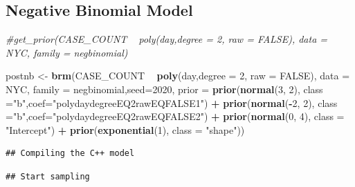 \documentclass[]{article}
\newenvironment{Shaded}{\begin{snugshade}}{\end{snugshade}}
\newcommand{\CommentTok}[1]{\textcolor[rgb]{0.56,0.35,0.01}{\textit{#1}}}
\newcommand{\DataTypeTok}[1]{\textcolor[rgb]{0.13,0.29,0.53}{#1}}
\newcommand{\DecValTok}[1]{\textcolor[rgb]{0.00,0.00,0.81}{#1}}
\newcommand{\KeywordTok}[1]{\textcolor[rgb]{0.13,0.29,0.53}{\textbf{#1}}}
\newcommand{\NormalTok}[1]{#1}
\newcommand{\OperatorTok}[1]{\textcolor[rgb]{0.81,0.36,0.00}{\textbf{#1}}}
\newcommand{\OtherTok}[1]{\textcolor[rgb]{0.56,0.35,0.01}{#1}}
\newcommand{\StringTok}[1]{\textcolor[rgb]{0.31,0.60,0.02}{#1}}
\begin{document}
\hypertarget{negative-binomial-model}{%
\subsection{Negative Binomial Model}\label{negative-binomial-model}}

\begin{Shaded}
\begin{Highlighting}[]
\CommentTok{#get_prior(CASE_COUNT ~ poly(day,degree = 2, raw = FALSE), data = NYC, family =  negbinomial)}

\NormalTok{postnb <-}\StringTok{ }\KeywordTok{brm}\NormalTok{(CASE_COUNT }\OperatorTok{~}\StringTok{ }\KeywordTok{poly}\NormalTok{(day,}\DataTypeTok{degree =} \DecValTok{2}\NormalTok{, }\DataTypeTok{raw =} \OtherTok{FALSE}\NormalTok{), }\DataTypeTok{data =}\NormalTok{ NYC, }\DataTypeTok{family =}\NormalTok{  negbinomial,}\DataTypeTok{seed=}\DecValTok{2020}\NormalTok{, }\DataTypeTok{prior =} 
          \KeywordTok{prior}\NormalTok{(}\KeywordTok{normal}\NormalTok{(}\DecValTok{3}\NormalTok{, }\DecValTok{2}\NormalTok{), }\DataTypeTok{class =}\StringTok{"b"}\NormalTok{,}\DataTypeTok{coef=}\StringTok{"polydaydegreeEQ2rawEQFALSE1"}\NormalTok{) }\OperatorTok{+}\StringTok{ }
\StringTok{          }\KeywordTok{prior}\NormalTok{(}\KeywordTok{normal}\NormalTok{(}\OperatorTok{-}\DecValTok{2}\NormalTok{, }\DecValTok{2}\NormalTok{), }\DataTypeTok{class =}\StringTok{"b"}\NormalTok{,}\DataTypeTok{coef=}\StringTok{"polydaydegreeEQ2rawEQFALSE2"}\NormalTok{) }\OperatorTok{+}
\StringTok{          }\KeywordTok{prior}\NormalTok{(}\KeywordTok{normal}\NormalTok{(}\DecValTok{0}\NormalTok{, }\DecValTok{4}\NormalTok{), }\DataTypeTok{class =} \StringTok{"Intercept"}\NormalTok{) }\OperatorTok{+}\StringTok{ }
\StringTok{          }\KeywordTok{prior}\NormalTok{(}\KeywordTok{exponential}\NormalTok{(}\DecValTok{1}\NormalTok{), }\DataTypeTok{class =} \StringTok{"shape"}\NormalTok{))}
\end{Highlighting}
\end{Shaded}

\begin{verbatim}
## Compiling the C++ model
\end{verbatim}

\begin{verbatim}
## Start sampling
\end{verbatim}
\end{document}
